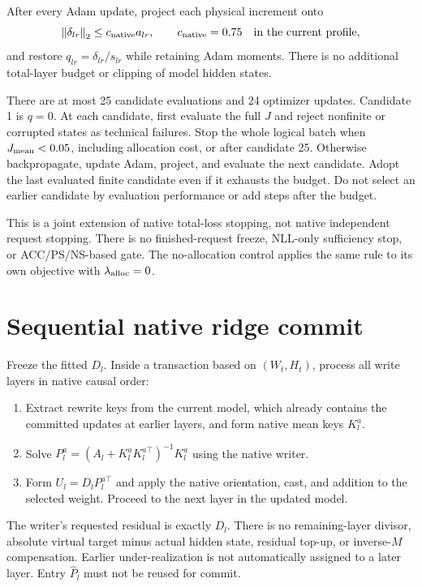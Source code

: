 \documentclass[11pt]{article}
\newcommand{\norm}[1]{\left\lVert #1\right\rVert}
\begin{document}
After every Adam update, project each physical increment onto
\begin{equation}
 \norm{\delta_{lr}}_2\leq c_{\rm native}a_{lr},
 \qquad c_{\rm native}=0.75\quad\hbox{in the current profile},
\end{equation}
and restore $q_{lr}=\delta_{lr}/s_{lr}$ while retaining Adam moments.
There is no additional total-layer budget or clipping of model hidden states.

There are at most 25 candidate evaluations and 24 optimizer updates. Candidate
1 is $q=0$. At each candidate, first evaluate the full $J$ and reject nonfinite
or corrupted states as technical failures. Stop the whole logical batch when
$J_{\rm mean}<0.05$, including allocation cost, or after candidate 25. Otherwise
backpropagate, update Adam, project, and evaluate the next candidate. Adopt the
last evaluated finite candidate even if it exhausts the budget. Do not select
an earlier candidate by evaluation performance or add steps after the budget.

This is a joint extension of native total-loss stopping, not native independent
request stopping. There is no finished-request freeze, NLL-only sufficiency
stop, or ACC/PS/NS-based gate. The no-allocation control applies the same rule
to its own objective with $\lambda_{\rm alloc}=0$.

\section{Sequential native ridge commit}
Freeze the fitted $D_l$. Inside a transaction based on $(W_t,H_t)$, process all
write layers in native causal order:
\begin{enumerate}
 \item Extract rewrite keys from the current model, which already contains
       the committed updates at earlier layers, and form native mean keys $K_l^a$.
 \item Solve $P_l^a=(A_l+K_l^aK_l^{a\top})^{-1}K_l^a$ using the native writer.
 \item Form $U_l=D_lP_l^{a\top}$ and apply the native orientation, cast, and
       addition to the selected weight. Proceed to the next layer in the updated model.
\end{enumerate}
The writer's requested residual is exactly $D_l$. There is no remaining-layer
divisor, absolute virtual target minus actual hidden state, residual top-up,
or inverse-$M$ compensation. Earlier under-realization is not automatically
assigned to a later layer. Entry $\widehat P_l$ must not be reused for commit.
\end{document}
